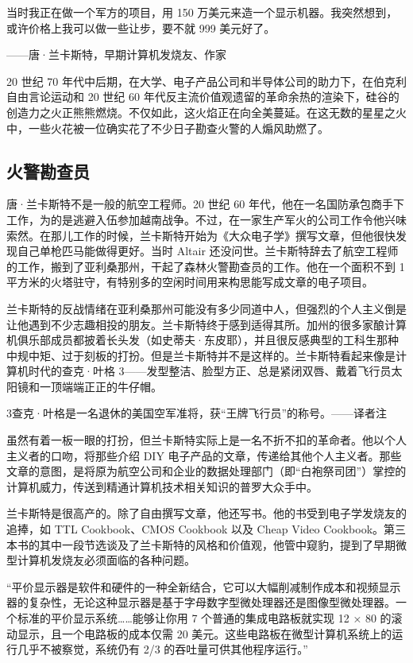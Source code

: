 \documentclass[12pt,UTF8]{ctexbook}
\begin{document}
当时我正在做一个军方的项目，用 150 万美元来造一个显示机器。我突然想到，或许价格上我可以做一些让步，要不就 999 美元好了。

——唐·兰卡斯特，早期计算机发烧友、作家



20 世纪 70 年代中后期，在大学、电子产品公司和半导体公司的助力下，在伯克利自由言论运动和 20 世纪 60 年代反主流价值观遗留的革命余热的渲染下，硅谷的创造力之火正熊熊燃烧。不仅如此，这火焰正在向全美蔓延。在这无数的星星之火中，一些火花被一位确实花了不少日子勘查火警的人煽风助燃了。





\subsection{火警勘查员}


唐·兰卡斯特不是一般的航空工程师。20 世纪 60 年代，他在一名国防承包商手下工作，为的是逃避入伍参加越南战争。不过，在一家生产军火的公司工作令他兴味索然。在那儿工作的时候，兰卡斯特开始为《大众电子学》撰写文章，但他很快发现自己单枪匹马能做得更好。当时 Altair 还没问世。兰卡斯特辞去了航空工程师的工作，搬到了亚利桑那州，干起了森林火警勘查员的工作。他在一个面积不到 1 平方米的火塔驻守，有特别多的空闲时间用来构思能写成文章的电子项目。

兰卡斯特的反战情绪在亚利桑那州可能没有多少同道中人，但强烈的个人主义倒是让他遇到不少志趣相投的朋友。兰卡斯特终于感到适得其所。加州的很多家酿计算机俱乐部成员都披着长头发（如史蒂夫·东皮耶），并且很反感典型的工科生那种中规中矩、过于刻板的打扮。但是兰卡斯特并不是这样的。兰卡斯特看起来像是计算机时代的查克·叶格 3——发型整洁、脸型方正、总是紧闭双唇、戴着飞行员太阳镜和一顶端端正正的牛仔帽。

3查克·叶格是一名退休的美国空军准将，获“王牌飞行员”的称号。——译者注

虽然有着一板一眼的打扮，但兰卡斯特实际上是一名不折不扣的革命者。他以个人主义者的口吻，将那些介绍 DIY 电子产品的文章，传递给其他个人主义者。那些文章的意图，是将原为航空公司和企业的数据处理部门（即“白袍祭司团”）掌控的计算机威力，传送到精通计算机技术相关知识的普罗大众手中。

兰卡斯特是很高产的。除了自由撰写文章，他还写书。他的书受到电子学发烧友的追捧，如 TTL Cookbook、CMOS Cookbook 以及 Cheap Video Cookbook。第三本书的其中一段节选谈及了兰卡斯特的风格和价值观，他管中窥豹，提到了早期微型计算机发烧友必须面临的各种问题。

“平价显示器是软件和硬件的一种全新结合，它可以大幅削减制作成本和视频显示器的复杂性，无论这种显示器是基于字母数字型微处理器还是图像型微处理器。一个标准的平价显示系统……能够让你用 7 个普通的集成电路板就实现 12 × 80 的滚动显示，且一个电路板的成本仅需 20 美元。这些电路板在微型计算机系统上的运行几乎不被察觉，系统仍有 2/3 的吞吐量可供其他程序运行。”
\end{document}
